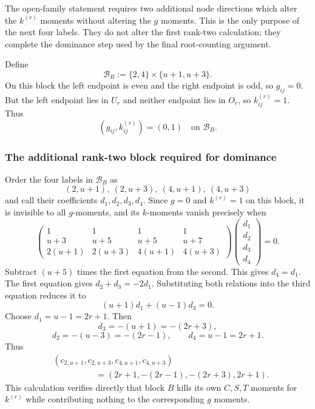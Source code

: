 \documentclass[11pt]{article}
\theoremstyle{definition}
\begin{document}
The open-family statement requires two additional node
directions which alter the $k^{(r)}$ moments without altering the $g$
moments.  This is the only purpose of the next four labels.  They do not
alter the first rank-two calculation; they complete the dominance step used
by the final root-counting argument.

Define
\begin{equation}
\mathcal B_B:=\{2,4\}\times\{u+1,u+3\}.
\label{eq:blockB}
\end{equation}
On this block the left endpoint is even and the right endpoint is odd, so
$g_{ij}=0$.  But the left endpoint lies in $U_r$ and neither endpoint lies
in $O_r$, so $k^{(r)}_{ij}=1$.  Thus
\begin{equation}
(g_{ij},k^{(r)}_{ij})=(0,1)
\quad\text{on }\mathcal B_B.
\label{eq:weightsB}
\end{equation}

\subsubsection{The additional rank-two block required for dominance}

Order the four labels in $\mathcal B_B$ as
\[
(2,u+1),\ (2,u+3),\ (4,u+1),\ (4,u+3)
\]
and call their coefficients $d_1,d_2,d_3,d_4$.  Since $g=0$ and $k^{(r)}=1$ on this block, it is invisible to all $g$-moments, and its $k$-moments vanish precisely when
\begin{equation}
\begin{pmatrix}
1&1&1&1\\
u+3&u+5&u+5&u+7\\
2(u+1)&2(u+3)&4(u+1)&4(u+3)
\end{pmatrix}
\begin{pmatrix}d_1\\d_2\\d_3\\d_4\end{pmatrix}=0.
\label{eq:blockB-system}
\end{equation}
Subtract $(u+5)$ times the first equation from the second.  This gives $d_4=d_1$.  The first equation gives $d_2+d_3=-2d_1$.  Substituting both relations into the third equation reduces it to
\[
(u+1)d_1+(u-1)d_3=0.
\]
Choose $d_1=u-1=2r+1$.  Then
\[
d_3=-(u+1)=-(2r+3),
\]
\[
d_2=-(u-3)=-(2r-1),
\qquad
d_4=u-1=2r+1.
\]
Thus
\begin{equation}
\boxed{
\begin{aligned}
&(c_{2,u+1},c_{2,u+3},c_{4,u+1},c_{4,u+3})\\
&\hspace{5em}=(2r+1,-(2r-1),-(2r+3),2r+1).
\end{aligned}}
\label{eq:blockB-coeff}
\end{equation}
This calculation verifies directly that block $B$ kills its own $C,S,T$ moments for $k^{(r)}$ while contributing nothing to the corresponding $g$ moments.
\end{document}
